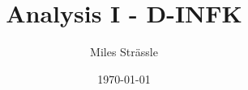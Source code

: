 \documentclass[11pt]{article}
\begin{document}
\title{Analysis I - D-INFK}
\author{Miles Strässle}
\date{\today}
\maketitle

\setcounter{tocdepth}{2}

\setcounter{page}{1}




% 
% 



\end{document}

